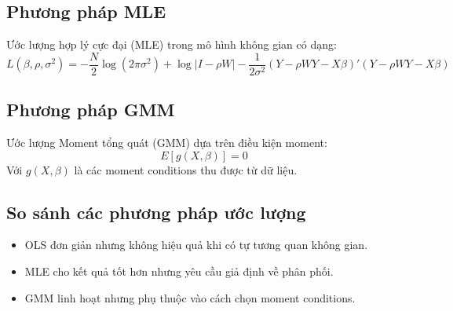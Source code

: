 \subsection{Phương pháp MLE}
Ước lượng hợp lý cực đại (MLE) trong mô hình không gian có dạng:
\begin{equation}
    L(\beta, \rho, \sigma^2) = -\frac{N}{2} \log(2\pi \sigma^2) + \log |I - \rho W| - \frac{1}{2 \sigma^2} (Y - \rho W Y - X \beta)' (Y - \rho W Y - X \beta)
\end{equation}

\subsection{Phương pháp GMM}
Ước lượng Moment tổng quát (GMM) dựa trên điều kiện moment:
\begin{equation}
    E[g(X, \beta)] = 0
\end{equation}
Với $g(X, \beta)$ là các moment conditions thu được từ dữ liệu.

\subsection{So sánh các phương pháp ước lượng}
\begin{itemize}
    \item OLS đơn giản nhưng không hiệu quả khi có tự tương quan không gian.
    \item MLE cho kết quả tốt hơn nhưng yêu cầu giả định về phân phối.
    \item GMM linh hoạt nhưng phụ thuộc vào cách chọn moment conditions.
\end{itemize}
